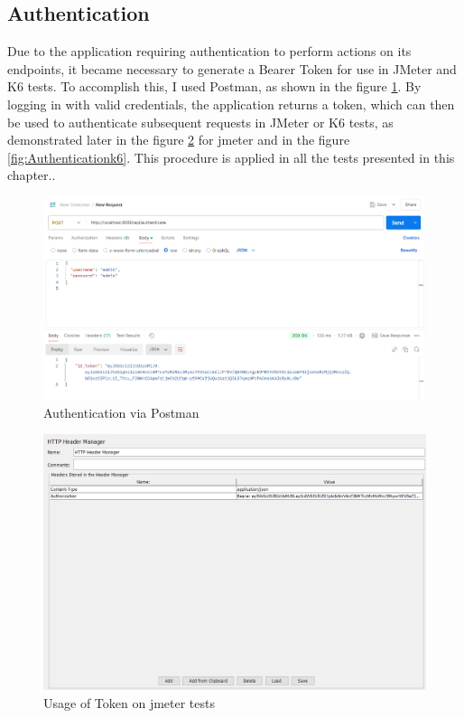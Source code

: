 \documentclass[a4paper,11pt,openright,BCOR=15mm]{scrbook}
\begin{document}
\subsection{Authentication}
Due to the application requiring authentication to perform actions on its endpoints, it became necessary to generate a Bearer Token for use in JMeter and K6 tests. To accomplish this, I used Postman, as shown in the figure \ref{fig:Authentication}. By logging in with valid credentials, the application returns a token, which can then be used to authenticate subsequent requests in JMeter or K6 tests, as demonstrated later in the figure \ref{fig:Authenticationjmeter} for jmeter and in the figure \ref{fig:Authenticationk6}. This procedure is applied in all the tests presented in this chapter..
\begin{figure}[H]
	\centering
	\includegraphics[width=\textwidth]{figs/Performance/Authentication.png}
	\caption{Authentication via Postman}
	\label{fig:Authentication}
\end{figure}
\begin{figure}[H]
	\centering
	\includegraphics[width=\textwidth]{figs/Performance/AuthenticationjMeter.png}
	\caption{Usage of Token on jmeter tests}
	\label{fig:Authenticationjmeter}
\end{figure}
\end{document}
